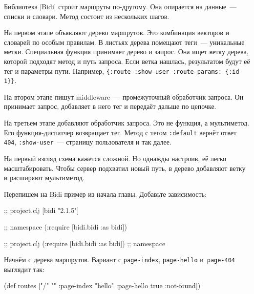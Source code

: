 Библиотека [Bidi] строит маршруты
по-другому. Она опирается на данные~--- списки и словари. Метод состоит из
нескольких шагов.

На первом этапе объявляют дерево маршрутов. Это комбинация векторов и словарей
по особым правилам. В листьях дерева помещают теги~--- уникальные
метки. Специальная функция принимает дерево и запрос. Она ищет ветку дерева,
которой подходят метод и путь запроса. Если ветка нашлась, результатом будут
её тег и параметры пути. Например, \verb|{:route :show-user :route-params: {:id 1}}|.


На втором этапе пишут middleware~--- промежуточный обработчик запроса. Он
принимает запрос, добавляет в него тег и передаёт дальше по цепочке.

На третьем этапе добавляют обработчик запроса. Это не функция, а мультиметод.
Его функция-диспатчер возвращает тег. Метод с тегом \verb|:default| вернёт
ответ \verb|404|, \verb|:show-user|~--- страницу пользователя и так далее.

На первый взгляд схема кажется сложной. Но однажды настроив, её легко
масштабировать. Чтобы сервер подхватил новый путь, в дерево добавляют ветку и
расширяют мультиметод.


Перепишем на Bidi пример из начала главы. Добавьте зависимость:

\ifx\DEVICETYPE\MOBILE

\begin{english}
  \begin{clojure}
;; project.clj
[bidi "2.1.5"]

;; namespace
(:require [bidi.bidi :as bidi])
  \end{clojure}
\end{english}

\else

\begin{english}
  \begin{clojure}
[bidi "2.1.5"]                  ;; project.clj
(:require [bidi.bidi :as bidi]) ;; namespace
  \end{clojure}
\end{english}

\fi

Начнём с дерева маршрутов. Вариант с \verb|page-index|, \verb|page-hello|
и~\verb|page-404| выглядит так:

\begin{english}
  \begin{clojure}
(def routes
  ["/" {""      :page-index
        "hello" :page-hello
        true    :not-found}])
  \end{clojure}
\end{english}

